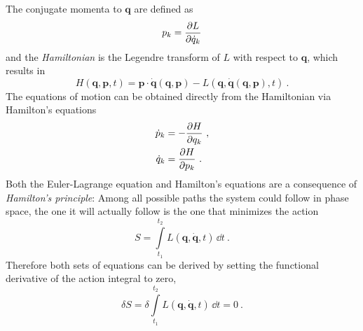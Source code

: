 \documentclass{scrartcl}
\renewcommand{\vec}[1]{\boldsymbol{#1}}
\newcommand{\lag}{L}
\newcommand{\ham}{H}
\begin{document}
The conjugate momenta to $\vec{q}$ are defined as
\begin{equation}\label{eq:conj_momenta}
p_k = \pdv{\lag}{\dot{q}_k}
\end{equation}
and the \emph{Hamiltonian} is the Legendre transform of $L$ with respect to $\vec{q}$, which results in
\begin{equation}\label{eq:def_hamiltonian}
\ham(\vec{q},\vec{p},t) = \vec{p}\cdot\dot{\vec{q}}(\vec{q},\vec{p}) - \lag(\vec{q},\dot{\vec{q}}(\vec{q},\vec{p}),t) \ .
\end{equation}
The equations of motion can be obtained directly from the Hamiltonian via Hamilton's equations
\begin{align}
\dot{p}_k &= -\pdv{\ham}{q_k} \ , \nonumber \\
\dot{q}_k &= \pdv{\ham}{p_k} \ . \label{eq:hamilton}
\end{align}
Both the Euler-Lagrange equation and Hamilton's equations are a consequence of \emph{Hamilton's principle}: Among all possible paths the system could follow in phase space, the one it will actually follow is the one that minimizes the action 
\begin{equation*}
S = \int\limits_{t_1}^{t_2}\lag(\vec{q},\dot{\vec{q}},t) \, \dd{t} \ .
\end{equation*}
Therefore both sets of equations can be derived by setting the functional derivative of the action integral to zero,
\begin{equation*}
\delta S = \delta \int\limits_{t_1}^{t_2}\lag(\vec{q},\dot{\vec{q}},t) \, \dd{t} = 0 \ .
\end{equation*}
\end{document}
